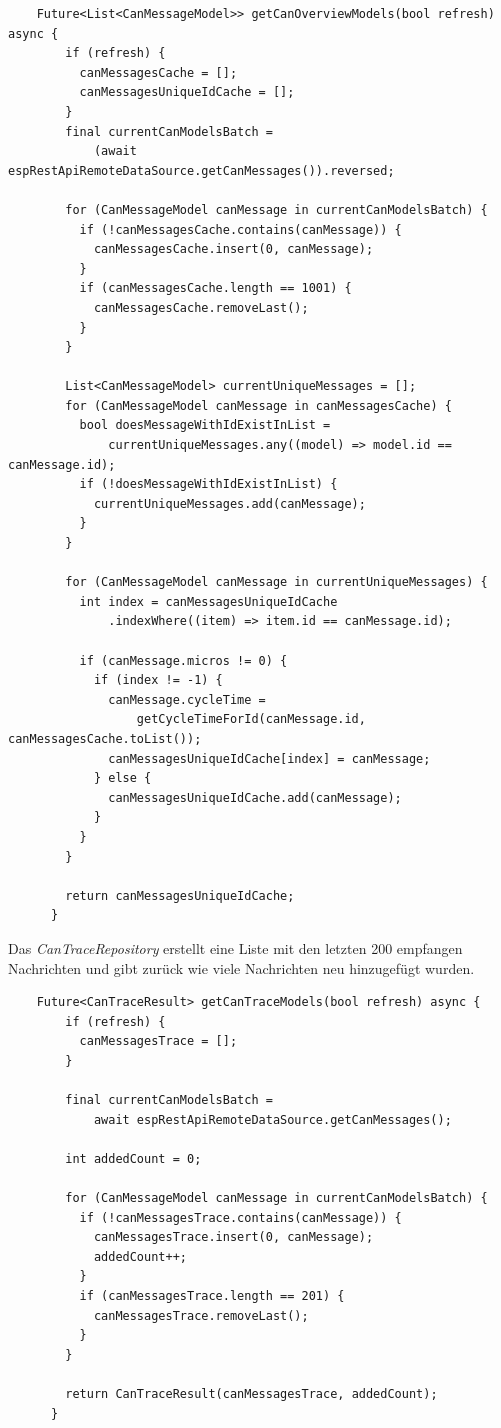 \begin{lstlisting}
    Future<List<CanMessageModel>> getCanOverviewModels(bool refresh) async {
        if (refresh) {
          canMessagesCache = [];
          canMessagesUniqueIdCache = [];
        }
        final currentCanModelsBatch =
            (await espRestApiRemoteDataSource.getCanMessages()).reversed;
    
        for (CanMessageModel canMessage in currentCanModelsBatch) {
          if (!canMessagesCache.contains(canMessage)) {
            canMessagesCache.insert(0, canMessage);
          }
          if (canMessagesCache.length == 1001) {
            canMessagesCache.removeLast();
          }
        }
    
        List<CanMessageModel> currentUniqueMessages = [];
        for (CanMessageModel canMessage in canMessagesCache) {
          bool doesMessageWithIdExistInList =
              currentUniqueMessages.any((model) => model.id == canMessage.id);
          if (!doesMessageWithIdExistInList) {
            currentUniqueMessages.add(canMessage);
          }
        }
    
        for (CanMessageModel canMessage in currentUniqueMessages) {
          int index = canMessagesUniqueIdCache
              .indexWhere((item) => item.id == canMessage.id);
    
          if (canMessage.micros != 0) {
            if (index != -1) {
              canMessage.cycleTime =
                  getCycleTimeForId(canMessage.id, canMessagesCache.toList());
              canMessagesUniqueIdCache[index] = canMessage;
            } else {
              canMessagesUniqueIdCache.add(canMessage);
            }
          }
        }
    
        return canMessagesUniqueIdCache;
      }       
\end{lstlisting}
Das \textit{CanTraceRepository} erstellt eine Liste mit den letzten 200 empfangen Nachrichten und gibt zurück wie viele Nachrichten neu hinzugefügt wurden.
\begin{lstlisting}
    Future<CanTraceResult> getCanTraceModels(bool refresh) async {
        if (refresh) {
          canMessagesTrace = [];
        }
    
        final currentCanModelsBatch =
            await espRestApiRemoteDataSource.getCanMessages();
    
        int addedCount = 0;
    
        for (CanMessageModel canMessage in currentCanModelsBatch) {
          if (!canMessagesTrace.contains(canMessage)) {
            canMessagesTrace.insert(0, canMessage);
            addedCount++;
          }
          if (canMessagesTrace.length == 201) {
            canMessagesTrace.removeLast();
          }
        }
    
        return CanTraceResult(canMessagesTrace, addedCount);
      }    
\end{lstlisting}

